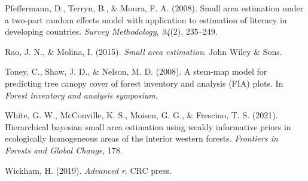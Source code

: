 \documentclass[12pt,twoside]{reedthesis}
\newlength{\cslhangindent}
\newenvironment{CSLReferences}[2] %
 {%
  \setlength{\parindent}{0pt}
  \ifodd #1 \everypar{\setlength{\hangindent}{\cslhangindent}}\ignorespaces\fi
  \ifnum #2 > 0
  \setlength{\parskip}{#2\baselineskip}
  \fi
 }%
 {}
\begin{document}
\begin{CSLReferences}{1}{0}
\leavevmode{}%
Pfeffermann, D., Terryn, B., \& Moura, F. A. (2008). Small area estimation under a two-part random effects model with application to estimation of literacy in developing countries. \emph{Survey Methodology}, \emph{34}(2), 235--249.

\leavevmode{}%
Rao, J. N., \& Molina, I. (2015). \emph{Small area estimation}. John Wiley \& Sons.

\leavevmode{}%
Toney, C., Shaw, J. D., \& Nelson, M. D. (2008). A stem-map model for predicting tree canopy cover of forest inventory and analysis (FIA) plots. In \emph{Forest inventory and analysis symposium}.

\leavevmode{}%
White, G. W., McConville, K. S., Moisen, G. G., \& Frescino, T. S. (2021). Hierarchical bayesian small area estimation using weakly informative priors in ecologically homogeneous areas of the interior western forests. \emph{Frontiers in Forests and Global Change}, 178.

\leavevmode{}%
Wickham, H. (2019). \emph{Advanced r}. CRC press.

\end{CSLReferences}

\end{document}
